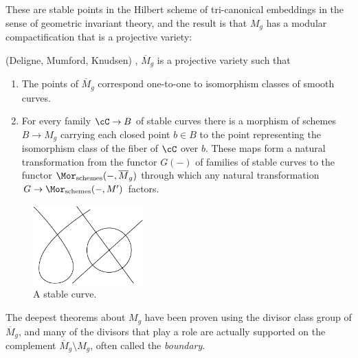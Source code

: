 These are stable points in the Hilbert scheme of tri-canonical embeddings in the sense of geometric invariant theory, and the result is that $M_g$ has a modular compactification that is a projective variety:


\begin{theorem}(Deligne, Mumford, Knudsen) \cite{Deligne-Mumford}, \cite{MR702954}\label{DM is coarse}
$\overline M_g$ is a projective variety such that
\begin{enumerate}
 \item The points of $\overline M_g$ correspond one-to-one to isomorphism classes of smooth curves.
 \item For every family $\cC \to B$ of stable curves there is a morphism of schemes $B\to M_g$ carrying
 each closed point  $b \in B$ to the point representing the isomorphism class of the fiber of $\cC$ over $b$. 
 These maps form a natural transformation from the functor $G(-)$ of families of stable curves to the functor 
 $\Mor_{\rm schemes}(-, \overline M_g)$ through which any natural transformation $G \to \Mor_{\rm schemes}(-, M')$
 factors.
\end{enumerate}
\end{theorem}

\begin{figure}\label{Fig7.2}
\centerline {\includegraphics[height=1.2in]{"main/Fig07-2"}}
\caption{A stable curve.}
\label{default}
\end{figure}

%
%
The deepest theorems about $M_{g}$ have been proven using the divisor class group of $\overline M_{g}$,
and many of the divisors that play a role are actually supported on the complement $\overline M_{g} \setminus M_{g}$, often called the \emph{boundary}.

